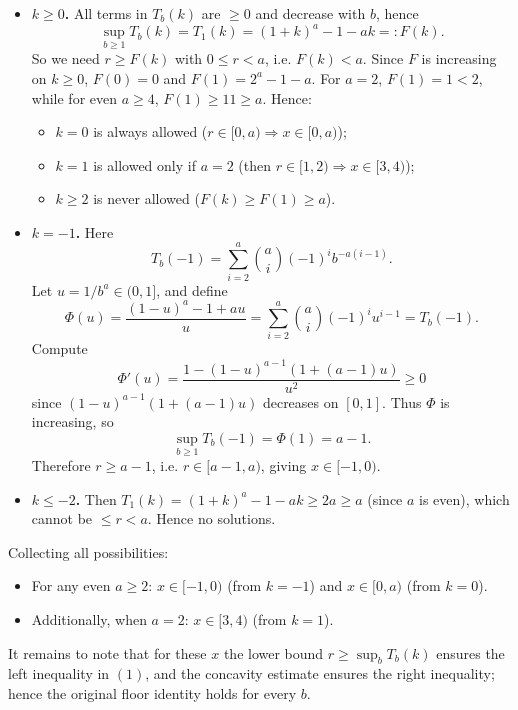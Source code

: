 \documentclass[12pt,a4paper]{article}
\theoremstyle{definition}
\begin{document}
    \begin{itemize}
        \item \textbf{$k \geq 0$.} All terms in $T_b(k)$ are $\geq 0$ and decrease with $b$, hence
        $$\sup_{b \geq 1} T_b(k) = T_1(k) = (1 + k)^a - 1 - ak =: F(k).$$
        So we need $r \geq F(k)$ with $0 \leq r < a$, i.e. $F(k) < a$. Since $F$ is increasing on $k \geq 0$,
        $F(0) = 0$ and $F(1) = 2^a - 1 - a$. For $a = 2$, $F(1) = 1 < 2$, while for even $a \geq 4$, $F(1) \geq 11 \geq a$. Hence:
        \begin{itemize}
            \item $k = 0$ is always allowed ($r \in [0, a) \Rightarrow x \in [0, a)$);
            \item $k = 1$ is allowed only if $a = 2$ (then $r \in [1, 2) \Rightarrow x \in [3, 4)$);
            \item $k \geq 2$ is never allowed ($F(k) \geq F(1) \geq a$).
        \end{itemize}

        \item \textbf{$k = -1$.} Here
        $$T_b(-1) = \sum_{i=2}^a \binom{a}{i}(-1)^i b^{-a(i-1)}.$$
        Let $u = 1/b^a \in (0, 1]$, and define
        $$\Phi(u) = \frac{(1 - u)^a - 1 + au}{u} = \sum_{i=2}^a \binom{a}{i}(-1)^i u^{i-1} = T_b(-1).$$
        Compute
        $$\Phi'(u) = \frac{1 - (1 - u)^{a-1}(1 + (a - 1)u)}{u^2} \geq 0$$
        since $(1 - u)^{a-1}(1 + (a - 1)u)$ decreases on $[0,1]$. Thus $\Phi$ is increasing, so
        $$\sup_{b \geq 1} T_b(-1) = \Phi(1) = a - 1.$$
        Therefore $r \geq a - 1$, i.e. $r \in [a - 1, a)$, giving $x \in [-1, 0)$.

        \item \textbf{$k \leq -2$.} Then $T_1(k) = (1 + k)^a - 1 - ak \geq 2a \geq a$ (since $a$ is even), which cannot be $\leq r < a$. Hence no solutions.
    \end{itemize}

    Collecting all possibilities:
    \begin{itemize}
        \item For any even $a \geq 2$: $x \in [-1, 0)$ (from $k = -1$) and $x \in [0, a)$ (from $k = 0$).
        \item Additionally, when $a = 2$: $x \in [3, 4)$ (from $k = 1$).
    \end{itemize}

    It remains to note that for these $x$ the lower bound $r \geq \sup_b T_b(k)$ ensures the left inequality in $(1)$, and the concavity estimate ensures the right inequality; hence the original floor identity holds for every $b$.
\end{document}
